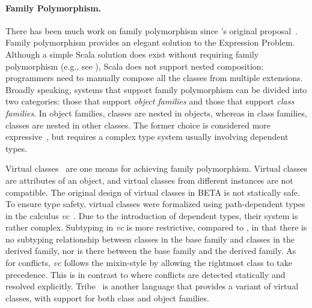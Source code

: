 \paragraph{Family Polymorphism.}
There has been much work on family polymorphism since \citeauthor{Ernst_2001}'s
original proposal~\citep{Ernst_2001}. Family polymorphism provides an elegant
solution to the Expression Problem. Although a simple Scala solution does exist without
requiring family polymorphism (e.g., see \citet{wang2016expression}), Scala
does not support nested composition: programmers need to manually compose
all the classes from multiple extensions. Broadly speaking, systems that support
family polymorphism can be divided into two categories: those that support
\textit{object families} and those that support \textit{class families}. In
object families, classes are nested in objects, whereas in class families,
classes are nested in other classes. The former choice is considered more
expressive~\citep{ErnstVirtual}, but requires a complex type system usually
involving dependent types.

Virtual classes~\citep{Madsen_1989} are one means for achieving family
polymorphism. Virtual classes are attributes of an object, and virtual classes
from different instances are not compatible. The original design of virtual
classes in BETA is not statically safe.
To ensure type safety, virtual classes were formalized using path-dependent
types in the calculus \textit{vc}~\citep{ErnstVirtual}. Due to the introduction
of dependent types, their system is rather complex. Subtyping in \textit{vc} is
more restrictive, compared to \name, in that there is no subtyping relationship
between classes in the base family and classes in the derived family, nor is there between
the base family and the derived family. As for conflicts, \textit{vc} follows the
mixin-style by allowing the rightmost class to take precedence. This is in
contrast to \name where conflicts are detected statically and resolved
explicitly. Tribe~\citep{pubsdoc:tribe-virtual-calculus} is another language
that provides a variant of virtual classes, with support for both class and
object families. %


